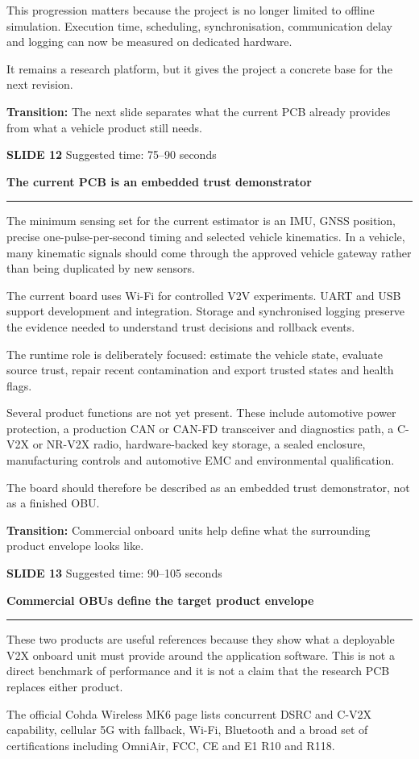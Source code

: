 \documentclass[11pt,a4paper]{article}
\newcommand{\slidetitle}[3]{%
  \clearpage
  {\color{BrandCyan}\large\bfseries SLIDE #1}\hfill
  {\color{Muted}\small Suggested time: #3}\par
  \vspace{0.18cm}
  {\color{BrandBlue}\LARGE\bfseries #2}\par
  \vspace{0.20cm}
  {\color{BrandMagenta}\rule{1.1cm}{1.2pt}}\par
  \vspace{0.12cm}
}
\newcommand{\transition}[1]{%
  \vfill
  \colorbox{Panel}{%
    \parbox{\dimexpr\textwidth-2\fboxsep\relax}{%
      \raggedright\textbf{Transition:} #1}}
}
\begin{document}
This progression matters because the project is no longer limited to offline simulation. Execution time, scheduling, synchronisation, communication delay and logging can now be measured on dedicated hardware.

It remains a research platform, but it gives the project a concrete base for the next revision.

\transition{The next slide separates what the current PCB already provides from what a vehicle product still needs.}

\slidetitle{12}{The current PCB is an embedded trust demonstrator}{75--90 seconds}

The minimum sensing set for the current estimator is an IMU, GNSS position, precise one-pulse-per-second timing and selected vehicle kinematics. In a vehicle, many kinematic signals should come through the approved vehicle gateway rather than being duplicated by new sensors.

The current board uses Wi-Fi for controlled V2V experiments. UART and USB support development and integration. Storage and synchronised logging preserve the evidence needed to understand trust decisions and rollback events.

The runtime role is deliberately focused: estimate the vehicle state, evaluate source trust, repair recent contamination and export trusted states and health flags.

Several product functions are not yet present. These include automotive power protection, a production CAN or CAN-FD transceiver and diagnostics path, a C-V2X or NR-V2X radio, hardware-backed key storage, a sealed enclosure, manufacturing controls and automotive EMC and environmental qualification.

The board should therefore be described as an embedded trust demonstrator, not as a finished OBU.

\transition{Commercial onboard units help define what the surrounding product envelope looks like.}

\slidetitle{13}{Commercial OBUs define the target product envelope}{90--105 seconds}

These two products are useful references because they show what a deployable V2X onboard unit must provide around the application software. This is not a direct benchmark of performance and it is not a claim that the research PCB replaces either product.

The official Cohda Wireless MK6 page lists concurrent DSRC and C-V2X capability, cellular 5G with fallback, Wi-Fi, Bluetooth and a broad set of certifications including OmniAir, FCC, CE and E1 R10 and R118.
\end{document}

